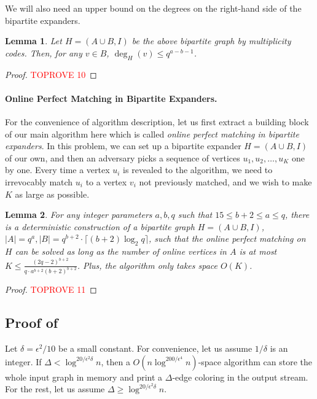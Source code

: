 \documentclass[11pt,a4paper]{article}
\newtheorem{lemma}{Lemma}[section]
\newcommand{\ceil}[1]{\lceil #1 \rceil}
\begin{document}
We will also need an upper bound on the degrees on the right-hand side of the bipartite expanders.
\begin{lemma}\label{deg}
	Let $H = (A\cup B, I)$ be the above bipartite graph by multiplicity codes. Then, for any $v\in B$, $\deg_H(v)\leq q^{a-b-1}$. 
\end{lemma}
\begin{proof}\textcolor{red}{TOPROVE 10}\end{proof}

\paragraph*{Online Perfect Matching in Bipartite Expanders.}
For the convenience of algorithm description, let us first extract a building block of our main algorithm here which is called \emph{online perfect matching in bipartite expanders}. In this problem, we can set up a bipartite expander $H = (A\cup B, I)$ of our own, and then an adversary picks a sequence of vertices $u_1, u_2, \ldots, u_K$ one by one. Every time a vertex $u_i$ is revealed to the algorithm, we need to irrevocably match $u_i$ to a vertex $v_i$ not previously matched, and we wish to make $K$ as large as possible.

\begin{lemma}\label{perfect}
	For any integer parameters $a, b, q$ such that $15\leq b+2\leq a\leq q$, there is a deterministic construction of a bipartite graph $H = (A\cup B, I)$, $|A| = q^a, |B|= q^{b+2}\cdot \ceil{(b+2)\log_2 q}$, such that the online perfect matching on $H$ can be solved as long as the number of online vertices in $A$ is at most $K\leq \frac{(2q-2)^{b+2}}{q\cdot a^{b+2}(b+2)^{b+2}}$. Plus, the algorithm only takes space $O(K)$.
\end{lemma}
\begin{proof}\textcolor{red}{TOPROVE 11}\end{proof}


\subsection{Proof of }
Let $\delta = \epsilon^2/10$ be a small constant. For convenience, let us assume $1/\delta$ is an integer. If $\Delta < \log^{20/\epsilon^2\delta} n$, then a $O(n\log^{200/\epsilon^4}n)$-space algorithm can store the whole input graph in memory and print a $\Delta$-edge coloring in the output stream. For the rest, let us assume $\Delta \geq \log^{20/\epsilon^2\delta}n$.
\end{document}

